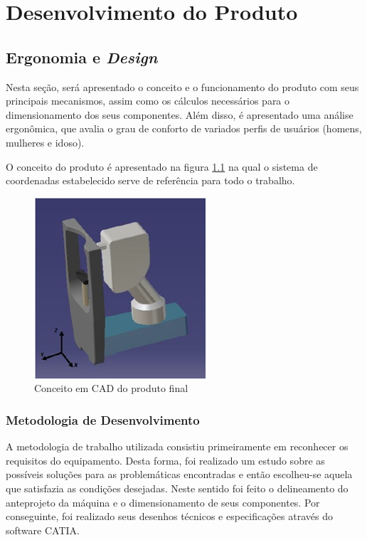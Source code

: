 
\chapter[Desenvolvimento do Produto]{Desenvolvimento do Produto}

\section[Ergonomia e Design]{Ergonomia e \textit{Design}}

Nesta seção, será apresentado o conceito e o funcionamento do produto com seus principais mecanismos, assim como os cálculos necessários para o dimensionamento dos seus componentes. Além disso, é apresentado uma análise ergonômica, que avalia o grau de conforto de variados perfis de usuários (homens, mulheres e idoso).

O conceito do produto é apresentado na figura \ref{conceito} na qual o sistema de coordenadas estabelecido serve de referência para todo o trabalho.


\begin{figure}[htb]
		\centering
			\includegraphics[scale=1.0]{figuras/conceito.png}
		\caption{Conceito em CAD do produto final}
		\label{conceito}
\end{figure}

\subsection[Metodologia de Desenvolvimento]{Metodologia de Desenvolvimento}

A metodologia de trabalho utilizada consistiu primeiramente em reconhecer os requisitos do equipamento. Desta forma, foi realizado um estudo sobre as possíveis soluções para as problemáticas encontradas e então escolheu-se aquela que satisfazia as condições desejadas. Neste sentido foi feito o delineamento do anteprojeto da máquina e o dimensionamento de seus componentes. Por conseguinte, foi realizado seus desenhos técnicos e especificações através do software CATIA.

